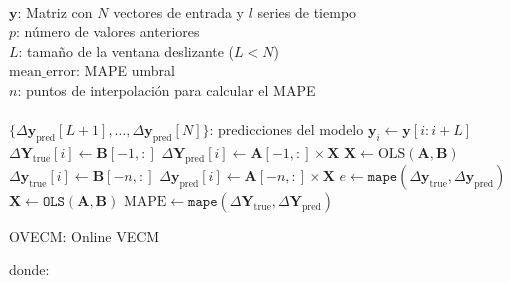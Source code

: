 \begin{algorithm}[h!]
\begin{algorithmic}[1]
\REQUIRE $\,$ \\
$\mathbf{y}$: Matriz con $N$ vectores de entrada y $l$ series de tiempo\\
$p$: número de valores anteriores \\
$L$: tamaño de la ventana deslizante ($L<N$) \\
$\text{mean\_error}$: MAPE umbral \\
$n$: puntos de interpolación para calcular el MAPE\\
\ENSURE  $\,$ \\
$\{\Delta \mathbf{y}_{\text{pred}}[L+1],\dots,\Delta \mathbf{y}_{\text{pred}}[N]\}$: predicciones del modelo
    \STATE $\mathbf{y}_i \gets \mathbf{y}[i:i+L]$
    \ELSE
        \STATE $\Delta \mathbf{Y}_{\text{true}}[i] \gets \mathbf{B}[-1,:]$
        \STATE $\Delta \mathbf{Y}_{\text{pred}}[i] \gets \mathbf{A}[-1,:] \times \mathbf{X}$
    \ENDIF
    \STATE $\mathbf{X} \gets \text{OLS} (\mathbf{A},\mathbf{B})$
    \STATE $\Delta \mathbf{y}_{\text{true}}[i] \gets \mathbf{B}[-n,:]$
    \STATE $\Delta \mathbf{y}_{\text{pred}}[i] \gets \mathbf{A}[-n,:] \times \mathbf{X}$
    \STATE $e \gets \texttt{mape}(\Delta \mathbf{y}_{\text{true}}, \Delta
    \mathbf{y}_{\text{pred}})$
        \STATE $\mathbf{X} \gets \texttt{OLS} (\mathbf{A},\mathbf{B})$
    \ENDIF
\ENDFOR
\STATE $\text{MAPE} \gets \texttt{mape}(\Delta \mathbf{Y}_{\text{true}}, \Delta
\mathbf{Y}_{\text{pred}})$
\end{algorithmic}
\caption{OVECM: Online VECM}
\label{alg:proposal}
\end{algorithm}

\noindent donde:

